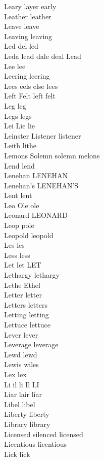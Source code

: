 Leary layer early\\
Leather leather\\
Leave leave\\
Leaving leaving\\
Led del led\\
Leda lead dale deal Lead\\
Lee lee\\
Leering leering\\
Lees eels else lees\\
Left Felt left felt\\
Leg leg\\
Legs legs\\
Lei Lie lie\\
Leinster Listener listener\\
Leith lithe\\
Lemons Solemn solemn melons\\
Lend lend\\
Lenehan LENEHAN\\
Lenehan's LENEHAN'S\\
Lent lent\\
Leo Ole ole\\
Leonard LEONARD\\
Leop pole\\
Leopold leopold\\
Les les\\
Less less\\
Let let LET\\
Lethargy lethargy\\
Lethe Ethel\\
Letter letter\\
Letters letters\\
Letting letting\\
Lettuce lettuce\\
Lever lever\\
Leverage leverage\\
Lewd lewd\\
Lewis wiles\\
Lex lex\\
Li il li Il LI\\
Liar lair liar\\
Libel libel\\
Liberty liberty\\
Library library\\
Licensed silenced licensed\\
Licentious licentious\\
Lick lick\\
